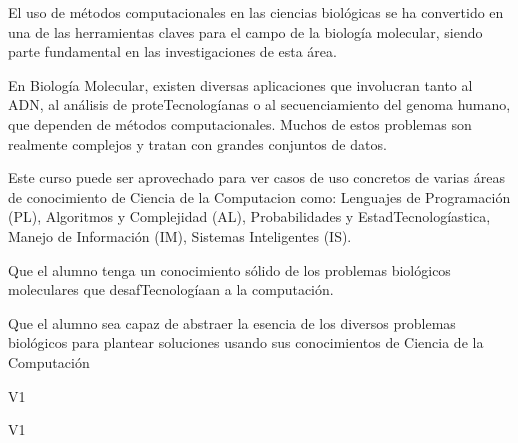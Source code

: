 \begin{syllabus}


\begin{justification}
El uso de métodos computacionales en las ciencias biológicas se ha convertido en una de las herramientas claves para el campo de la biología molecular, siendo parte fundamental en las investigaciones de esta área. 

En Biología Molecular, existen diversas aplicaciones que involucran tanto al ADN, al análisis de proteTecnologíanas o al secuenciamiento del genoma humano, que dependen de métodos computacionales. Muchos de estos problemas son realmente complejos y tratan con grandes conjuntos de datos. 

Este curso puede ser aprovechado para ver casos de uso concretos de varias áreas de conocimiento de Ciencia de la Computacion como: Lenguajes de Programación (PL), Algoritmos y Complejidad (AL), Probabilidades y EstadTecnologíastica, Manejo de Información (IM), Sistemas Inteligentes (IS).
\end{justification}

\begin{goals}
\item Que el alumno tenga un conocimiento sólido de los problemas biológicos moleculares que desafTecnologíaan a la computación.
\item Que el alumno sea capaz de abstraer la esencia de los diversos problemas biológicos para plantear soluciones usando sus conocimientos de Ciencia de la Computación
\end{goals}

\begin{outcomes}{V1}
    \item {}
    \item {}
    \item {}
\end{outcomes}

\begin{competences}{V1}
    \item {} 
    \item {}
    \item {}
\end{competences}


\end{syllabus}
